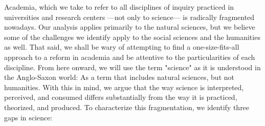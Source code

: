 \documentclass[twocolumn, serif, editorial, authordate]{jote-article}
\begin{document}
Academia, which we take to refer to all disciplines of inquiry practiced in universities and research centers ---not only to science--- is radically fragmented nowadays. Our analysis applies primarily to the natural sciences, but we believe some of the challenges we identify apply to the social sciences and the humanities as well. That said, we shall be wary of attempting to find a one-size-fits-all approach to a reform in academia and be attentive to the particularities of each discipline. From here onward, we will use the term "science" as it is understood in the Anglo-Saxon world: As a term that includes natural sciences, but not humanities. With this in mind, we argue that the way science is interpreted, perceived, and consumed differs substantially from the way it is practiced, theorized, and produced. To characterize this fragmentation, we identify three gaps in science: 
\end{document}
